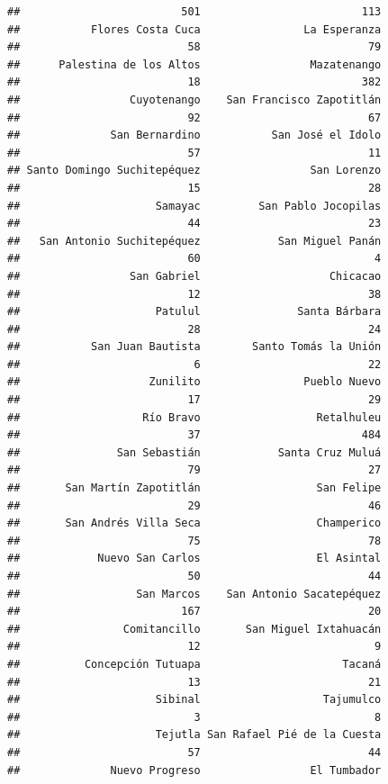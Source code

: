 \documentclass[
]{article}
\begin{document}
\begin{verbatim}
##                         501                         113 
##           Flores Costa Cuca                La Esperanza 
##                          58                          79 
##      Palestina de los Altos                 Mazatenango 
##                          18                         382 
##                 Cuyotenango    San Francisco Zapotitlán 
##                          92                          67 
##              San Bernardino           San José el Idolo 
##                          57                          11 
## Santo Domingo Suchitepéquez                 San Lorenzo 
##                          15                          28 
##                     Samayac         San Pablo Jocopilas 
##                          44                          23 
##   San Antonio Suchitepéquez            San Miguel Panán 
##                          60                           4 
##                 San Gabriel                    Chicacao 
##                          12                          38 
##                     Patulul               Santa Bárbara 
##                          28                          24 
##           San Juan Bautista        Santo Tomás la Unión 
##                           6                          22 
##                    Zunilito                Pueblo Nuevo 
##                          17                          29 
##                   Río Bravo                  Retalhuleu 
##                          37                         484 
##               San Sebastián            Santa Cruz Muluá 
##                          79                          27 
##       San Martín Zapotitlán                  San Felipe 
##                          29                          46 
##       San Andrés Villa Seca                  Champerico 
##                          75                          78 
##            Nuevo San Carlos                  El Asintal 
##                          50                          44 
##                  San Marcos    San Antonio Sacatepéquez 
##                         167                          20 
##                Comitancillo       San Miguel Ixtahuacán 
##                          12                           9 
##          Concepción Tutuapa                      Tacaná 
##                          13                          21 
##                     Sibinal                   Tajumulco 
##                           3                           8 
##                     Tejutla San Rafael Pié de la Cuesta 
##                          57                          44 
##              Nuevo Progreso                 El Tumbador 

\end{verbatim}
\end{document}
